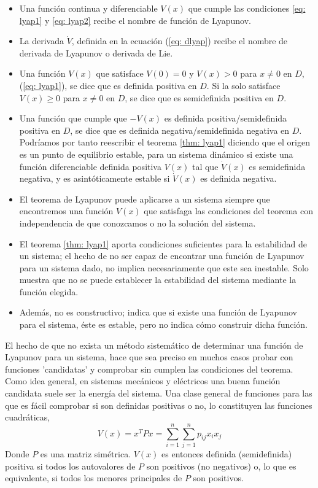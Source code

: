 \begin{itemize}
\item Una función continua y diferenciable $V(x)$ que cumple las condiciones \ref{eq: lyap1} y \ref{eq: lyap2} recibe el nombre de función de Lyapunov.
\item La derivada $\dot V$, definida en la ecuación (\ref{eq: dlyap}) recibe el nombre de derivada de Lyapunov o derivada de Lie.
\item Una función $V(x)$ que satisface $V(0)=0$ y $V(x)>0$ para $x\neq 0$ en $D$, (\ref{eq: lyap1}), se dice que es definida positiva en $D$. Si la solo satisface $V(x)\geq 0$ para $x\neq 0$ en $D$, se dice que es semidefinida positiva en $D$.
\item Una función que cumple que $-V(x)$ es definida positiva/semidefinida positiva en $D$, se dice que es definida negativa/semidefinida negativa en $D$. Podríamos por tanto reescribir el teorema \ref{thm: lyap1} diciendo que el origen es un punto de equilibrio estable, para un sistema dinámico si existe una función diferenciable definida positiva $V(x)$ tal que $\dot V(x)$ es semidefinida negativa, y es asintóticamente estable si $\dot V(x)$ es definida negativa.
\item El teorema de Lyapunov puede aplicarse a un sistema siempre que encontremos una función $V(x)$ que satisfaga las condiciones del teorema con independencia de que conozcamos o no la solución del sistema.
\item El teorema \ref{thm: lyap1} aporta condiciones suficientes para la estabilidad de un sistema; el hecho de no ser capaz de encontrar una función de Lyapunov para un sistema dado, no implica necesariamente que este sea inestable. Solo muestra que no se puede establecer la estabilidad del sistema mediante la función elegida.
\item Además, no es constructivo; indica que si existe una función de Lyapunov para el sistema, éste es estable, pero no indica cómo construir dicha función. 
\end{itemize}

El hecho de que no exista un método sistemático de determinar una función de Lyapunov para un sistema, hace que sea preciso en muchos casos probar con funciones 'candidatas' y comprobar sin cumplen las condiciones del teorema. Como idea general, en sistemas mecánicos y eléctricos una buena función candidata suele ser la energía del sistema. Una clase general de funciones para las que es fácil comprobar si son definidas positivas o no, lo constituyen las funciones cuadráticas,
\begin{equation}
V(x) = x^TPx = \sum_{i=1}^n \sum_{j=1}^n p_{ij}x_ix_j
\end{equation}
Donde $P$ es una matriz simétrica. $V(x)$ es entonces definida (semidefinida) positiva si todos los autovalores de $P$ son positivos (no negativos) o, lo que es equivalente, si todos los menores principales de $P$ son positivos.

